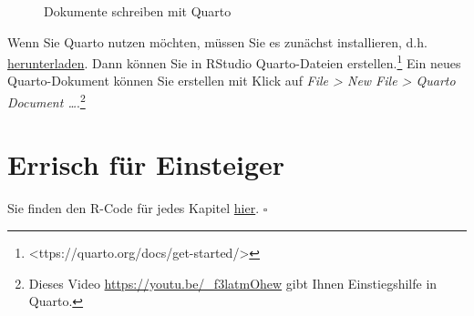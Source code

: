 \documentclass[
  a4paper,
  DIV=11]{scrreprt}
\theoremstyle{definition}
\theoremstyle{definition}
\theoremstyle{definition}
\theoremstyle{remark}
\begin{document}
\begin{figure}


\caption{\label{fig-exm-quarto}Dokumente schreiben mit Quarto}

\end{figure}%

Wenn Sie Quarto nutzen möchten, müssen Sie es zunächst installieren,
d.h. \href{https://quarto.org/docs/get-started/}{herunterladen}. Dann
können Sie in RStudio Quarto-Dateien erstellen.\footnote{\textless ttps://quarto.org/docs/get-started/\textgreater{}}
Ein neues Quarto-Dokument können Sie erstellen mit Klick auf \emph{File
\textgreater{} New File \textgreater{} Quarto Document
\ldots{}}.\footnote{Dieses Video \url{https://youtu.be/_f3latmOhew} gibt
  Ihnen Einstiegshilfe in Quarto.}

\section{Errisch für Einsteiger}\label{errisch-fuxfcr-einsteiger}

\begin{tcolorbox}[enhanced jigsaw, leftrule=.75mm, opacitybacktitle=0.6, colback=white, colframe=quarto-callout-note-color-frame, coltitle=black, colbacktitle=quarto-callout-note-color!10!white, opacityback=0, left=2mm, breakable, titlerule=0mm, toptitle=1mm, bottomtitle=1mm, rightrule=.15mm, title=\textcolor{quarto-callout-note-color}{\faInfo}\hspace{0.5em}{Hinweis}, arc=.35mm, bottomrule=.15mm, toprule=.15mm]

Sie finden den R-Code für jedes Kapitel
\href{https://github.com/sebastiansauer/statistik1/tree/main/R-code-for-all-chapters}{hier}.
\(\square\)

\end{tcolorbox}
\end{document}
